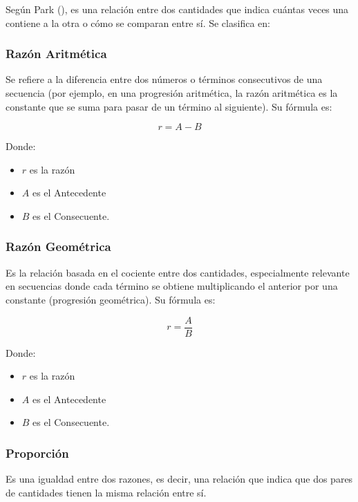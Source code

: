 \documentclass[
  stu,
  floatsintext,
  longtable,
  a4paper,
  nolmodern,
  notxfonts,
  notimes,
  12pt,
  colorlinks=true,linkcolor=blue,citecolor=blue,urlcolor=blue]{apa7}
\begin{document}
Según Park (),
es una relación entre dos cantidades que indica cuántas veces una
contiene a la otra o cómo se comparan entre sí. Se clasifica en:

\subsubsection{Razón Aritmética}\label{razuxf3n-aritmuxe9tica}

Se refiere a la diferencia entre dos números o términos consecutivos de
una secuencia (por ejemplo, en una progresión aritmética, la razón
aritmética es la constante que se suma para pasar de un término al
siguiente). Su fórmula es:

\[
  r = A - B
  \]

Donde:

\begin{itemize}
\item
  \(r\) es la razón
\item
  \(A\) es el Antecedente
\item
  \(B\) es el Consecuente.
\end{itemize}

\subsubsection{Razón Geométrica}\label{razuxf3n-geomuxe9trica}

Es la relación basada en el cociente entre dos cantidades, especialmente
relevante en secuencias donde cada término se obtiene multiplicando el
anterior por una constante (progresión geométrica). Su fórmula es:

\[
r = \frac{A}{B}
\]

Donde:

\begin{itemize}
\item
  \(r\) es la razón
\item
  \(A\) es el Antecedente
\item
  \(B\) es el Consecuente.
\end{itemize}

\subsubsection{Proporción}\label{proporciuxf3n}

Es una igualdad entre dos razones, es decir, una relación que indica que
dos pares de cantidades tienen la misma relación entre sí.
\end{document}
